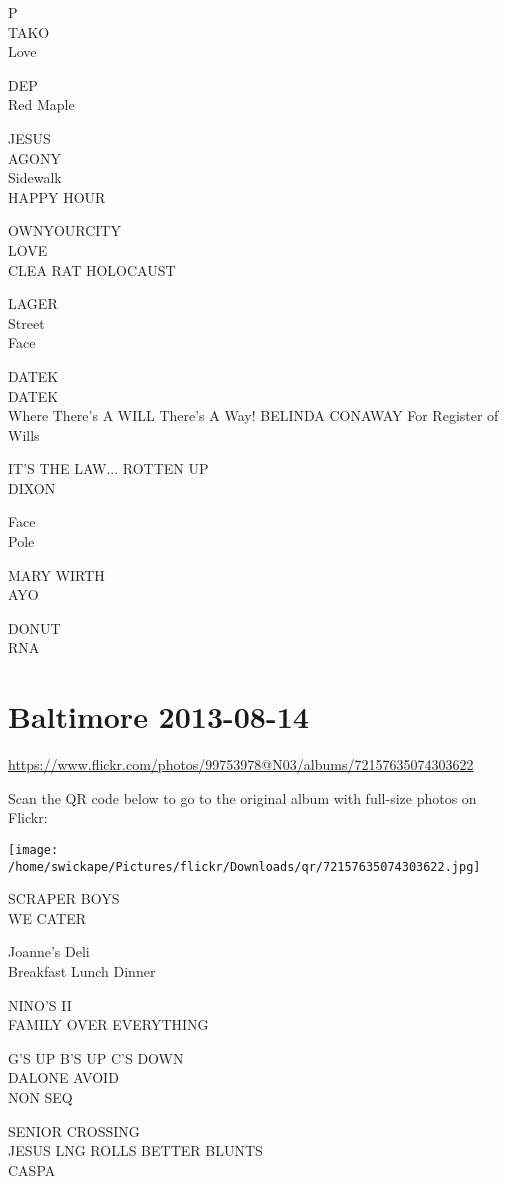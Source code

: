 \documentclass[10pt,letterpaper]{article}
\begin{document}
P\\
TAKO\\
Love

DEP\\
Red Maple

JESUS\\
AGONY\\
Sidewalk\\
HAPPY HOUR

OWNYOURCITY\\
LOVE\\
CLEA RAT HOLOCAUST

LAGER\\
Street\\
Face

DATEK\\
DATEK\\
Where There's A WILL There's A Way!  BELINDA CONAWAY For Register of Wills

IT'S THE LAW... ROTTEN UP\\
DIXON

Face\\
Pole

MARY WIRTH\\
AYO

DONUT\\
RNA


\section*{Baltimore 2013-08-14}

\url{https://www.flickr.com/photos/99753978@N03/albums/72157635074303622}

Scan the QR code below to go to the original album with full-size photos on Flickr:

\texttt{[image: /home/swickape/Pictures/flickr/Downloads/qr/72157635074303622.jpg]}


SCRAPER BOYS\\
WE CATER

Joanne's Deli\\
Breakfast Lunch Dinner

NINO'S II\\
FAMILY OVER EVERYTHING

G'S UP B'S UP C'S DOWN\\
DALONE AVOID\\
NON SEQ

SENIOR CROSSING\\
JESUS LNG ROLLS BETTER BLUNTS\\
CASPA
\end{document}
